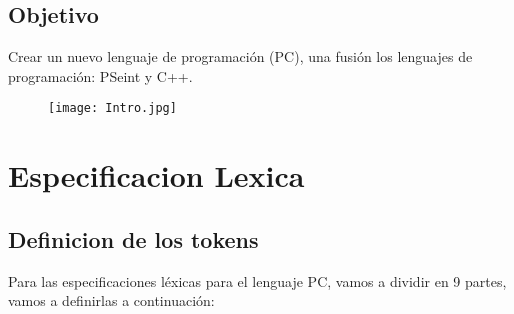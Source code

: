 \documentclass{article}
\begin{document}
\subsection{Objetivo}
Crear un nuevo lenguaje de programación (PC), una fusión los lenguajes de programación: PSeint y C++.

\vspace{0.5cm}

\begin{figure}[htbp]
    \centering
    \texttt{[image: Intro.jpg]}
    \label{fig:ejemplo}
\end{figure}

\newpage %

\section{Especificacion Lexica}
\subsection{Definicion de los tokens}
Para las especificaciones léxicas para el lenguaje PC, vamos a dividir en 9 partes, vamos a definirlas a continuación:
\end{document}
